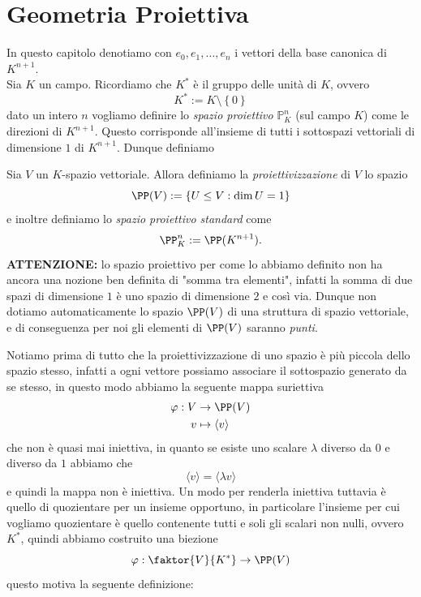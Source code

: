 \documentclass[11pt]{scrartcl}
\begin{document}
   	 
   	 \newpage
   	 
   	 \section{Geometria Proiettiva}
   	 In questo capitolo denotiamo con $e_0,e_1,\dots,e_n$ i vettori della base canonica di $K^{n+1}$. \\
   	 Sia $K$ un campo. Ricordiamo che $K^*$ è il gruppo delle unità di $K$, ovvero 
   	 $$K^*:=K\setminus\left\{0\right\}$$
   	 dato un intero $n$ vogliamo definire lo \textit{spazio proiettivo} $\mathbb{P}^n_K$ (sul campo $K$) come le direzioni di $K^{n+1}$. Questo corrisponde all'insieme di tutti i sottospazi vettoriali di dimensione $1$ di $K^{n+1}$. Dunque definiamo
   	 \begin{definition}
   	 	Sia $V$ un $K$-spazio vettoriale. Allora definiamo la \textit{proiettivizzazione} di $V$ lo spazio 
   	 	$$\PP(V):=\left\{U\le V:\dim U =1\right\}$$
   	 	e inoltre definiamo lo \textit{spazio proiettivo standard} come
   	 	$$\PP^n_K:=\PP(K^{n+1}).$$
   	 	\textbf{ATTENZIONE:} lo spazio proiettivo per come lo abbiamo definito non ha ancora una nozione ben definita di "somma tra elementi", infatti la somma di due spazi di dimensione $1$ è uno spazio di dimensione $2$ e così via. Dunque non dotiamo automaticamente lo spazio $\PP(V)$ di una struttura di spazio vettoriale, e di conseguenza per noi gli elementi di $\PP(V)$ saranno \textit{punti}.
   	 \end{definition}
   	 Notiamo prima di tutto che la proiettivizzazione di uno spazio è più piccola dello spazio stesso, infatti a ogni vettore possiamo associare il sottospazio generato da se stesso, in questo modo abbiamo la seguente mappa suriettiva
   	 \begin{align*}
   	 	\varphi:V &\to \PP(V) \\
   	 	v & \mapsto  \langle v \rangle 
   	 \end{align*}   	 
   	 che non è quasi mai iniettiva, in quanto se esiste uno scalare $\lambda$ diverso da $0$ e diverso da $1$ abbiamo che 
   	 $$\langle v \rangle=\langle \lambda v \rangle$$
   	 e quindi la mappa non è iniettiva. Un modo per renderla iniettiva tuttavia è quello di quozientare per un insieme opportuno, in particolare l'insieme per cui vogliamo quozientare è quello contenente tutti e soli gli scalari non nulli, ovvero $K^*$, quindi abbiamo costruito una biezione
   	 $$\varphi: \faktor{V}{K^*}\to \PP(V)$$
   	 questo motiva la seguente definizione:
\end{document}
